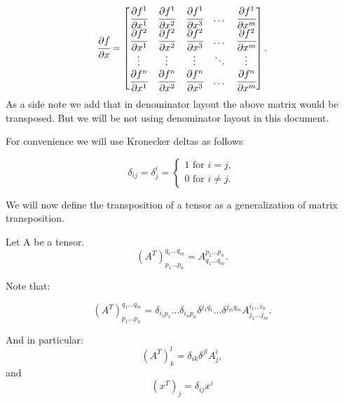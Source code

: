 \documentclass[main.tex]{subfiles}
\begin{document}
\begin{equation}
\cfrac{\partial f}{\partial x} = \begin{bmatrix}
    \cfrac{\partial f^1}{\partial x^1} & \cfrac{\partial f^1}{\partial x^2} & \cfrac{\partial f^1}{\partial x^3} & \dots  & \cfrac{\partial f^1}{\partial x^m} \\
    \cfrac{\partial f^2}{\partial x^1} & \cfrac{\partial f^2}{\partial x^2} & \cfrac{\partial f^2}{\partial x^3} & \dots  & \cfrac{\partial f^2}{\partial x^m} \\
    
    \vdots & \vdots & \vdots & \ddots & \vdots \\
    \cfrac{\partial f^n}{\partial x^1} & \cfrac{\partial f^n}{\partial x^2} & \cfrac{\partial f^n}{\partial x^3} & \dots  & \cfrac{\partial f^n}{\partial x^m} \\
\end{bmatrix}.
\end{equation}
As a side note we add that in denominator layout the above matrix would be transposed. But we will be not using denominator layout in this document.

For convenience we will use Kronecker deltas as follows

\begin{equation}
    \delta_{ij} = \delta^i_j =
    \begin{cases}
      1 \text{ for } i = j,\\
      0 \text{ for } i \not= j.
    \end{cases}
\end{equation}

We will now define the transposition of a tensor as a generalization of matrix transposition.

\begin{definition}
Let A be a tensor.
\begin{equation}
(A^T)^{q_1\dots q_m}_{p_1\dots p_n} =
A^{p_1\dots p_n}_{q_1\dots q_m}.
\end{equation}

Note that:


\begin{equation}
(A^T)^{q_1\dots q_m}_{p_1\dots p_n} =
\delta_{i_1 p_1} \dots \delta_{i_n p_n} \delta^{j_1 q_1} \dots \delta^{j_m q_m} A^{i_1\dots i_n}_{j_1\dots j_m}.
\end{equation}
\end{definition}

And in particular:
\begin{equation}
(A^T)^l_k = \delta_{ik}\delta^{jl} A^i_j , 
\end{equation}
and 
\begin{equation}
(x^T)_j = \delta_{ij} x^i
\end{equation}
\end{document}
